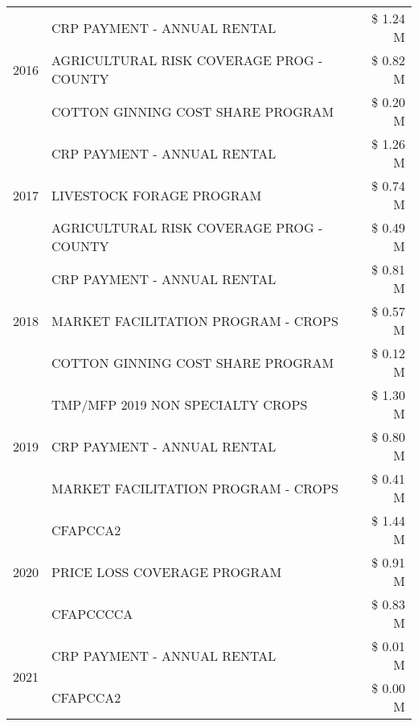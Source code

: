 \begin{tabular}{llr}
\cline{1-3}
\multirow[t]{3}{*}{2016} & CRP PAYMENT - ANNUAL RENTAL & \$ 1.24 M \\
 & AGRICULTURAL RISK COVERAGE PROG - COUNTY & \$ 0.82 M \\
 & COTTON GINNING COST SHARE PROGRAM & \$ 0.20 M \\
\cline{1-3}
\multirow[t]{3}{*}{2017} & CRP PAYMENT - ANNUAL RENTAL & \$ 1.26 M \\
 & LIVESTOCK FORAGE PROGRAM & \$ 0.74 M \\
 & AGRICULTURAL RISK COVERAGE PROG - COUNTY & \$ 0.49 M \\
\cline{1-3}
\multirow[t]{3}{*}{2018} & CRP PAYMENT - ANNUAL RENTAL & \$ 0.81 M \\
 & MARKET FACILITATION PROGRAM - CROPS & \$ 0.57 M \\
 & COTTON GINNING COST SHARE PROGRAM & \$ 0.12 M \\
\cline{1-3}
\multirow[t]{3}{*}{2019} & TMP/MFP 2019 NON SPECIALTY CROPS & \$ 1.30 M \\
 & CRP PAYMENT - ANNUAL RENTAL & \$ 0.80 M \\
 & MARKET FACILITATION PROGRAM - CROPS & \$ 0.41 M \\
\cline{1-3}
\multirow[t]{3}{*}{2020} & CFAPCCA2 & \$ 1.44 M \\
 & PRICE LOSS COVERAGE PROGRAM & \$ 0.91 M \\
 & CFAPCCCCA & \$ 0.83 M \\
\cline{1-3}
\multirow[t]{2}{*}{2021} & CRP PAYMENT - ANNUAL RENTAL & \$ 0.01 M \\
 & CFAPCCA2 & \$ 0.00 M \\
\cline{1-3}
\bottomrule
\end{tabular}
